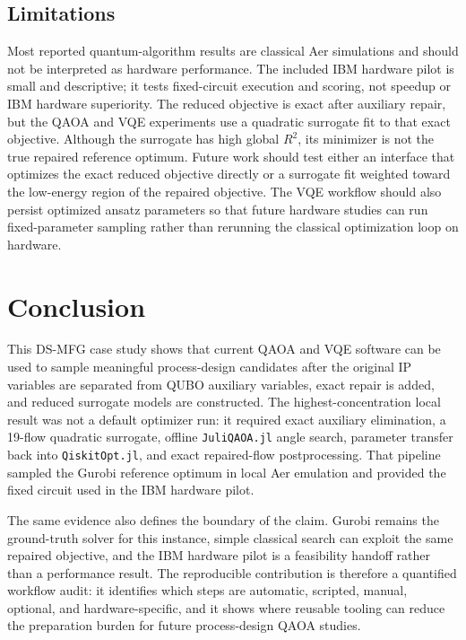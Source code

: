 \subsection{Limitations}
\label{subsec:ds-mfg-limitations}

Most reported quantum-algorithm results are classical Aer simulations and
should not be interpreted as hardware performance. The included IBM hardware
pilot is small and descriptive; it tests fixed-circuit execution and scoring,
not speedup or IBM hardware superiority. The reduced objective is exact after
auxiliary repair, but the QAOA and VQE experiments use a quadratic surrogate
fit to that exact objective. Although the surrogate has high global $R^2$, its
minimizer is not the true repaired reference optimum. Future work should test
either an interface that optimizes the exact reduced objective directly or a
surrogate fit weighted toward the low-energy region of the repaired objective.
The VQE workflow should also persist optimized ansatz parameters so that future
hardware studies can run fixed-parameter sampling rather than rerunning the
classical optimization loop on hardware.

\section{Conclusion}
\label{sec:ds-mfg-conclusion}

This DS-MFG case study shows that current QAOA and VQE software can be used to
sample meaningful process-design candidates after the original IP variables are
separated from QUBO auxiliary variables, exact repair is added, and reduced
surrogate models are constructed. The highest-concentration local result was not a default
optimizer run: it required exact auxiliary elimination, a 19-flow quadratic
surrogate, offline \texttt{JuliQAOA.jl} angle search, parameter transfer back
into \texttt{QiskitOpt.jl}, and exact repaired-flow postprocessing. That
pipeline sampled the Gurobi reference optimum in local Aer emulation and provided
the fixed circuit used in the IBM hardware pilot.

The same evidence also defines the boundary of the claim. Gurobi remains the
ground-truth solver for this instance, simple classical search can exploit the
same repaired objective, and the IBM hardware pilot is a feasibility handoff
rather than a performance result. The reproducible contribution is therefore a
quantified workflow audit: it identifies which steps are automatic, scripted,
manual, optional, and hardware-specific, and it shows where reusable tooling can
reduce the preparation burden for future process-design QAOA studies.
